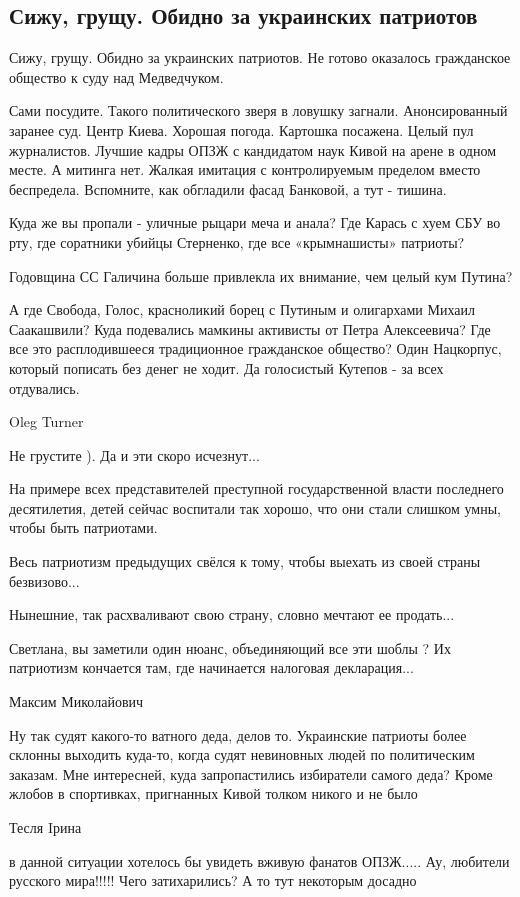  
 
 
 
 
\subsection{Сижу, грущу. Обидно за украинских патриотов}
\label{sec:15_05_2021.fb.krjukova_svetlana.1.medvedchuk_grust}

Сижу, грущу. Обидно за украинских патриотов. Не готово оказалось гражданское общество к суду над Медведчуком. 

Сами посудите. Такого политического зверя в ловушку загнали. Анонсированный
заранее суд. Центр Киева. Хорошая погода. Картошка посажена. Целый пул
журналистов. Лучшие кадры ОПЗЖ с кандидатом наук Кивой на арене в одном месте.
А митинга нет. Жалкая имитация с контролируемым пределом вместо беспредела.
Вспомните, как обгладили фасад Банковой, а тут - тишина. 

Куда же вы пропали - уличные рыцари меча и анала? Где Карась с хуем СБУ во рту,
где соратники убийцы Стерненко, где все «крымнашисты» патриоты? 

Годовщина СС Галичина больше привлекла их внимание, чем целый кум Путина? 

А где Свобода, Голос, красноликий борец с Путиным и олигархами Михаил
Саакашвили? Куда подевались мамкины активисты от Петра Алексеевича? Где все это
расплодившееся традиционное гражданское общество? Один Нацкорпус, который
пописать без денег не ходит. Да голосистый Кутепов - за всех отдувались.

Oleg Turner

Не грустите ). Да и эти скоро исчезнут...

На примере всех представителей преступной государственной власти последнего
десятилетия, детей сейчас воспитали так хорошо, что они стали слишком умны,
чтобы быть патриотами.

Весь патриотизм предыдущих свёлся к тому, чтобы выехать из своей страны безвизово...

Нынешние, так расхваливают свою страну, словно мечтают ее продать...

Светлана, вы заметили один нюанс, объединяющий все эти шоблы ? Их патриотизм
кончается там, где начинается налоговая декларация... 

Максим Миколайович

Ну так судят какого-то ватного деда, делов то. Украинские патриоты более
склонны выходить куда-то, когда судят невиновных людей по политическим заказам.
Мне интересней, куда запропастились избиратели самого деда? Кроме жлобов в
спортивках, пригнанных Кивой толком никого и не было

Тесля Iрина

в данной ситуации хотелось бы увидеть вживую фанатов ОПЗЖ..... Ау, любители
русского мира!!!!! Чего затихарились? А то тут некоторым досадно
